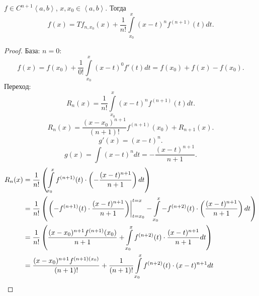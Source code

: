 \documentclass[11pt, oneside]{article}   	%
\begin{document}
\begin{definition}
    $f\in C^{n+1}\left<a, b\right>$, $x, x_0\in \left<a, b\right>$. Тогда
    \[ f(x) = Tf_{n,x_0}(x) + \frac{1}{n!} \int\limits_{x_0}^{x} (x-t)^{n}f^{(n+1)}(t) dt  .\]
    \begin{proof}
        База: $n=0$:
        \[ f(x) = f(x_0) + \frac{1}{0!} \int\limits_{x_0}^{x} (x-t)^{0} f'(t) dt = f(x_0) + f(x) - f(x_0)  .\]
        Переход:
        \[ R_n(x) = \frac{1}{n!} \int\limits_{x_0}^{x} (x-t)^{n}f^{(n+1)}(t)dt  .\]
        \[ R_{n}(x) = \frac{(x-x_0)^{n+1}}{(n+1)!} f^{(n+1)}(x_0) + R_{n+1}(x) .\]
        \[ g'(x) = (x-t)^{n} .\]
        \[ g(x) = \int (x-t)^{n} dt = -\frac{(x-t)^{n+1}}{n+1} .\]
        \begin{equation*}
            \begin{split}
                R_n(x) &= \frac{1}{n!}\left( \int\limits_{x_0}^{x} f^{(n+1)}(t) \cdot \left( - \frac{(x-t)^{n+1}}{n+1} \right)dt   \right)\\
                       &= \frac{1}{n!}\left( \left.\left(-f^{(n+1)}(t) \cdot \frac{(x-t)^{n+1}}{n+1}\right)\right|_{t=x_0}^{t=x} - \int\limits_{x_0}^{x} -f^{(n+2)}(t) \cdot  \left( \frac{(x-t)^{n+1}}{n+1} \right)dt    \right)\\
                       &= \frac{1}{n!}\left( \frac{(x-x_0)^{n+1}f^{(n+1)}(x_0)}{n+1} + \int\limits_{x_0}^{x} f^{(n+2)}(t) \cdot \frac{(x-t)^{n+1}}{n+1} dt \right)\\
                       &= \frac{(x-x_0)^{n+1}f^{(n+1)(x_0)}}{(n+1)!} + \frac{1}{(n+1)!} \int\limits_{x_0}^{x} f^{(n+2)}(t) \cdot (x-t)^{n+1} dt \qedhere 
            \end{split}
        \end{equation*}
    \end{proof}
\end{definition}
\end{document}
